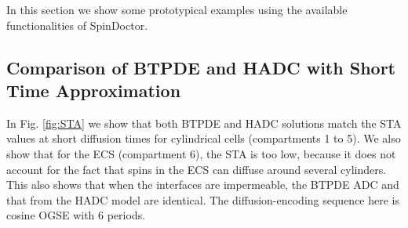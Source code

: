 \documentclass[a4paper]{article}
\begin{document}
In this section we show some prototypical examples using the available functionalities of SpinDoctor.



\subsection{Comparison of BTPDE and HADC with Short Time Approximation}

In Fig. \ref{fig:STA} we show that both BTPDE and HADC solutions match the STA values at short diffusion times for cylindrical cells (compartments 1 to 5). We also show that for the ECS (compartment 6), the STA is too low, because it does not account for the fact that spins in the ECS can diffuse around several cylinders. This also shows that when the interfaces are impermeable, the BTPDE ADC and that from the HADC model are identical. The diffusion-encoding sequence here is cosine OGSE with 6 periods.
\end{document}
